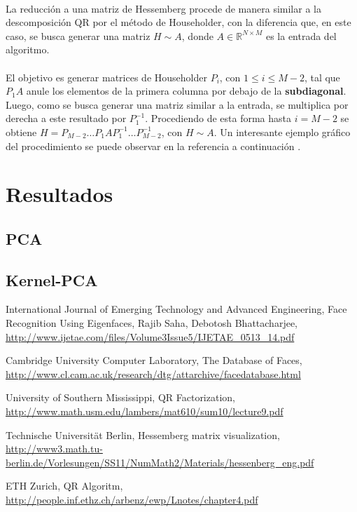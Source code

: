 \documentclass[12pt, twocolumn]{article}
\begin{document}
	\paragraph{} La reducción a una matriz de Hessemberg procede de manera similar a la descomposición QR por el método de Householder, con la diferencia que, en este caso, se busca generar una matriz $H \sim A$, donde $A \in \mathbb{R}^{N\times M}$ es la entrada del algoritmo. 
	
	\paragraph{} El objetivo es generar matrices de Householder $P_{i}$, con $ 1\le i \le M-2$, tal que $P_{1}A$ anule los elementos de la primera columna por debajo de la \textbf{subdiagonal}. Luego, como se busca generar una matriz similar a la entrada, se multiplica por derecha a este resultado por $P_{1}^{-1}$. Procediendo de esta forma hasta $i = M-2$ se obtiene $H = P_{M-2}\dots P_{1}AP_{1}^{-1}\dots P_{M-2}^{-1}$, con $H \sim A$. Un interesante ejemplo gráfico del procedimiento se puede observar en la referencia a continuación \cite{hess}. 
	
	\section{Resultados}
	
	\subsection{PCA}
	
	\subsection{Kernel-PCA}
	
	\begin{thebibliography}{9}
	
		International Journal of Emerging Technology and Advanced Engineering, Face 
		Recognition Using Eigenfaces, Rajib Saha, Debotosh Bhattacharjee,
		\url{http://www.ijetae.com/files/Volume3Issue5/IJETAE_0513_14.pdf}
		
		Cambridge University Computer Laboratory, The Database of Faces,
		\url{http://www.cl.cam.ac.uk/research/dtg/attarchive/facedatabase.html}
	
		University of Southern Mississippi, QR Factorization,
		\url{http://www.math.usm.edu/lambers/mat610/sum10/lecture9.pdf}
		
		Technische Universität Berlin, Hessemberg matrix visualization,
		\url{http://www3.math.tu-berlin.de/Vorlesungen/SS11/NumMath2/Materials/hessenberg_eng.pdf}
		
		ETH Zurich, QR Algoritm,
		\url{http://people.inf.ethz.ch/arbenz/ewp/Lnotes/chapter4.pdf}
	
	\end{thebibliography}
	
\end{document}
